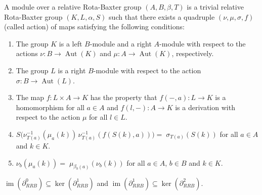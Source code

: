 \documentclass[10pt,a4paper]{amsart}
\newcommand{\Aut}{\operatorname{Aut} }
\newcommand{\IM}{\operatorname{im} }
\newcommand{\Ker}{\operatorname{ker} }
\begin{document}
\begin{defn}\label{moddefn}
	A module over a relative Rota-Baxter group $(A, B,\beta, T)$ is a trivial relative Rota-Baxter group $(K, L, \alpha, S)$ such that there exists a quadruple $(\nu, \mu, \sigma, f)$ (called action) of maps satisfying the following conditions:
	\begin{enumerate}
		\item The group $K$ is a left $B$-module and a right $A$-module with respect to the actions $\nu:B \to \Aut(K) $ and $\mu: A \to \Aut(K)$, respectively.
		\item The group $L$ is a right $B$-module with respect to the action $\sigma: B \to \Aut(L)$.
		\item The  map  $f: L \times A \to K$ has the property that $f(-,a): L \rightarrow K$ is a homomorphism for all $a \in A$ and $f(l,-): A \rightarrow K$ is a derivation with respect to the action $\mu$ for all $l \in L$.
		\item $S\big(\nu^{-1}_{T(a)}(\mu_{a}(k)) \,\nu^{-1}_{T( a)}(f(S(k), a))\big)=\;\sigma_{T(a)}(S(k))$ for all $ a \in A$ and $k \in K$.
		\item $\nu_b(\mu_{a}(k))= \;   \mu_{ \beta{_{b}(a)}}( \nu_{b} (k))$ for all $a \in A$, $b \in B$ and $k \in K$. 
	\end{enumerate}
\end{defn}

\begin{lemma}\label{rrb coboundary condition}
	$\IM(\partial^0_{RRB}) \subseteq  \Ker(\partial^1_{RRB})$ and	$\IM(\partial^1_{RRB}) \subseteq  \Ker(\partial^2_{RRB})$.
\end{lemma}
\end{document}
